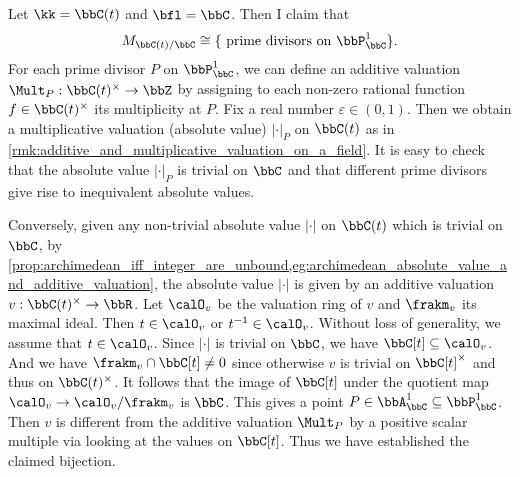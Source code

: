     \begin{example}\label{eg:relative_place_set_of_C_t}
        Let \(\kk = \bbC(t)\) and \(\bfl = \bbC\).
        Then I claim that
        \[ M_{\bbC(t)/\bbC} \cong \{\text{ prime divisors on } \bbP_\bbC^1\}. \]
        For each prime divisor \(P\) on \(\bbP_\bbC^1\), we can define an additive valuation \(\Mult_P: \bbC(t)^\times \to \bbZ\) by assigning to each non-zero rational function \(f \in \bbC(t)^\times\) its multiplicity at \(P\).
        Fix a real number \(\varepsilon \in (0,1)\).
        Then we obtain a multiplicative valuation (absolute value) \(|\cdot|_P\) on \(\bbC(t)\) as in \cref{rmk:additive_and_multiplicative_valuation_on_a_field}.
        It is easy to check that the absolute value \(|\cdot|_P\) is trivial on \(\bbC\) and that different prime divisors give rise to inequivalent absolute values.

        Conversely, given any non-trivial absolute value \(|\cdot|\) on \(\bbC(t)\) which is trivial on \(\bbC\), by \cref{prop:archimedean_iff_integer_are_unbound,eg:archimedean_absolute_value_and_additive_valuation}, 
        the absolute value \(|\cdot|\) is given by an additive valuation \(v: \bbC(t)^\times \to \bbR\).
        Let \(\calO_v\) be the valuation ring of \(v\) and \(\frakm_v\) its maximal ideal.
        Then \(t \in \calO_v\) or \(t^{-1} \in \calO_v\).
        Without loss of generality, we assume that \(t \in \calO_v\).
        Since \(|\cdot|\) is trivial on \(\bbC\), we have \(\bbC[t] \subseteq \calO_v\).
        And we have \(\frakm_v \cap \bbC[t] \neq 0\) since otherwise \(v\) is trivial on \(\bbC[t]^\times\) and thus on \(\bbC(t)^\times\).
        It follows that the image of \(\bbC[t]\) under the quotient map \(\calO_v \to \calO_v/\frakm_v\) is \(\bbC\).
        This gives a point \(P \in \bbA_\bbC^1 \subseteq \bbP_\bbC^1\).
        Then \(v\) is different from the additive valuation \(\Mult_P\) by a positive scalar multiple via looking at the values on \(\bbC[t]\).
        Thus we have established the claimed bijection.
    \end{example} 

